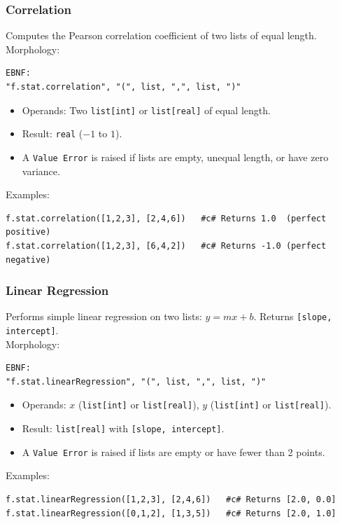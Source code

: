 \subsubsection{Correlation}
Computes the Pearson correlation coefficient of two lists of equal length. \\
Morphology:
\begin{verbatim}
EBNF:
"f.stat.correlation", "(", list, ",", list, ")"
\end{verbatim}
\begin{itemize}
\item Operands: Two \texttt{list[int]} or \texttt{list[real]} of equal length.
\item Result: \texttt{real} ($-1$ to $1$).
\item A \texttt{Value Error} is raised if lists are empty, unequal length, or have zero variance.
\end{itemize}
Examples:
\begin{verbatim}
f.stat.correlation([1,2,3], [2,4,6])   #c# Returns 1.0  (perfect positive)
f.stat.correlation([1,2,3], [6,4,2])   #c# Returns -1.0 (perfect negative)
\end{verbatim}

\subsubsection{Linear Regression}
Performs simple linear regression on two lists: $y = mx + b$. Returns \texttt{[slope, intercept]}. \\
Morphology:
\begin{verbatim}
EBNF:
"f.stat.linearRegression", "(", list, ",", list, ")"
\end{verbatim}
\begin{itemize}
\item Operands: $x$ (\texttt{list[int]} or \texttt{list[real]}), $y$ (\texttt{list[int]} or \texttt{list[real]}).
\item Result: \texttt{list[real]} with \texttt{[slope, intercept]}.
\item A \texttt{Value Error} is raised if lists are empty or have fewer than 2 points.
\end{itemize}
Examples:
\begin{verbatim}
f.stat.linearRegression([1,2,3], [2,4,6])   #c# Returns [2.0, 0.0]
f.stat.linearRegression([0,1,2], [1,3,5])   #c# Returns [2.0, 1.0]
\end{verbatim}


